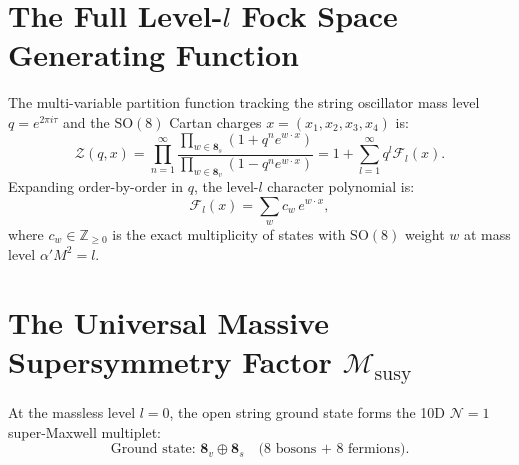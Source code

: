 \documentclass[11pt,a4paper]{article}
\begin{document}
\section{The Full Level-$l$ Fock Space Generating Function}

The multi-variable partition function tracking the string oscillator mass level $q = e^{2\pi i \tau}$ and the $\mathrm{SO}(8)$ Cartan charges $x = (x_1, x_2, x_3, x_4)$ is:
\begin{equation}
    \mathcal{Z}(q, x) = \prod_{n=1}^\infty \frac{\prod_{w \in \mathbf{8}_s} \left(1 + q^n e^{w \cdot x}\right)}{\prod_{w \in \mathbf{8}_v} \left(1 - q^n e^{w \cdot x}\right)} = 1 + \sum_{l=1}^\infty q^l \mathcal{F}_l(x).
\end{equation}
Expanding order-by-order in $q$, the level-$l$ character polynomial is:
\begin{equation}
    \mathcal{F}_l(x) = \sum_{w} c_w \, e^{w \cdot x},
\end{equation}
where $c_w \in \mathbb{Z}_{\ge 0}$ is the exact multiplicity of states with $\mathrm{SO}(8)$ weight $w$ at mass level $\alpha' M^2 = l$.

\section{The Universal Massive Supersymmetry Factor $\mathcal{M}_{\text{susy}}$}

At the massless level $l=0$, the open string ground state forms the 10D $\mathcal{N}=1$ super-Maxwell multiplet:
\begin{equation}
    \text{Ground state: } \mathbf{8}_v \oplus \mathbf{8}_s \quad \text{(8 bosons + 8 fermions)}.
\end{equation}
\end{document}
